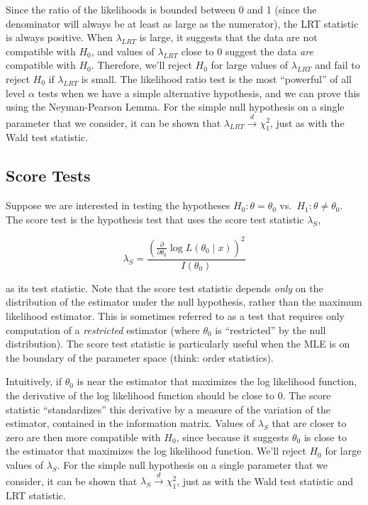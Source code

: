 \documentclass[
  letterpaper,
  DIV=11,
  numbers=noendperiod]{scrreprt}
\begin{document}
Since the ratio of the likelihoods is bounded between 0 and 1 (since the
denominator will always be at least as large as the numerator), the LRT
statistic is always positive. When \(\lambda_{LRT}\) is large, it
suggests that the data are not compatible with \(H_0\), and values of
\(\lambda_{LRT}\) close to \(0\) suggest the data \emph{are} compatible
with \(H_0\). Therefore, we'll reject \(H_0\) for large values of
\(\lambda_{LRT}\) and fail to reject \(H_0\) if \(\lambda_{LRT}\) is
small. The likelihood ratio test is the most ``powerful'' of all level
\(\alpha\) tests when we have a simple alternative hypothesis, and we
can prove this using the Neyman-Pearson Lemma. For the simple null
hypothesis on a single parameter that we consider, it can be shown that
\(\lambda_{LRT} \overset{d}{\to} \chi^2_1\), just as with the Wald test
statistic.

\subsection*{Score Tests}\label{score-tests}

Suppose we are interested in testing the hypotheses
\(H_0: \theta = \theta_0\) vs.~\(H_1: \theta \neq \theta_0\). The score
test is the hypothesis test that uses the score test statistic
\(\lambda_S\),

\[
\lambda_S = \frac{\left( \frac{\partial}{\partial \theta_0} \log L(\theta_0 \mid x) \right)^2}{I(\theta_0)}
\]

as its test statistic. Note that the score test statistic depends
\emph{only} on the distribution of the estimator under the null
hypothesis, rather than the maximum likelihood estimator. This is
sometimes referred to as a test that requires only computation of a
\emph{restricted} estimator (where \(\theta_0\) is ``restricted'' by the
null distribution). The score test statistic is particularly useful when
the MLE is on the boundary of the parameter space (think: order
statistics).

Intuitively, if \(\theta_0\) is near the estimator that maximizes the
log likelihood function, the derivative of the log likelihood function
should be close to \(0\). The score statistic ``standardizes'' this
derivative by a measure of the variation of the estimator, contained in
the information matrix. Values of \(\lambda_S\) that are closer to zero
are then more compatible with \(H_0\), since because it suggests
\(\theta_0\) is close to the estimator that maximizes the log likelihood
function. We'll reject \(H_0\) for large values of \(\lambda_S\). For
the simple null hypothesis on a single parameter that we consider, it
can be shown that \(\lambda_{S} \overset{d}{\to} \chi^2_1\), just as
with the Wald test statistic and LRT statistic.
\end{document}
